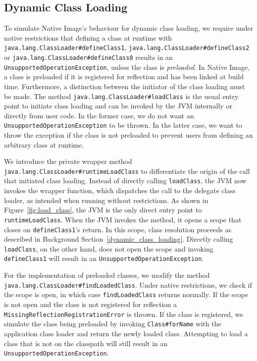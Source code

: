 \subsection{Dynamic Class Loading}
To simulate Native Image's behaviour for dynamic class loading, we require under native restrictions that defining a class at runtime with \verb|java.lang.ClassLoader#defineClass1|, \verb|java.lang.ClassLoader#defineClass2| or \verb|java.lang.ClassLoader#defineClass0| results in an \verb|UnsupportedOperationException|, unless the class is \emph{preloaded}. In Native Image, a class is preloaded if it is registered for reflection and has been linked at build time.
Furthermore, a distinction between the initiator of the class loading must be made. The method \verb|java.lang.ClassLoader#loadClass| is the usual entry point to initiate class loading and can be invoked by the JVM internally or directly from user code. In the former case, we do not want an \verb|UnsupportedOperationException| to be thrown. In the latter case, we want to throw the exception if the class is not preloaded to prevent users from defining an arbitrary class at runtime.

We introduce the private wrapper method \verb|java.lang.ClassLoader#runtimeLoadClass| to differentiate the origin of the call that initiated class loading. Instead of directly calling \verb|loadClass|, the JVM now invokes the wrapper function, which dispatches the call to the delegate class loader, as intended when running without restrictions. As shown in Figure~\ref{fig:load_class}, the JVM is the only direct entry point to \verb|runtimeLoadClass|. When the JVM invokes the method, it opens a scope that closes on \verb|defineClass1|'s return. In this scope, class resolution proceeds as described in Background Section~\ref{dynamic_class_loading}. 
Directly calling \verb|loadClass|, on the other hand, does not open the scope and invoking \verb|defineClass1| will result in an \verb|UnsupportedOperationException|.

For the implementation of preloaded classes, we modify the method \verb|java.lang.ClassLoader#findLoadedClass|.
Under native restrictions, we check if the scope is open, in which case \verb|findLoadedClass| returns normally. If the scope is not open and the class is not registered for reflection a \verb|MissingReflectionRegistrationError| is thrown. If the class is registered, we simulate the class being preloaded by invoking \verb|Class#forName| with the application class loader and return the newly loaded class. Attempting to load a class that is not on the classpath will still result in an \verb|UnsupportedOperationException|.


